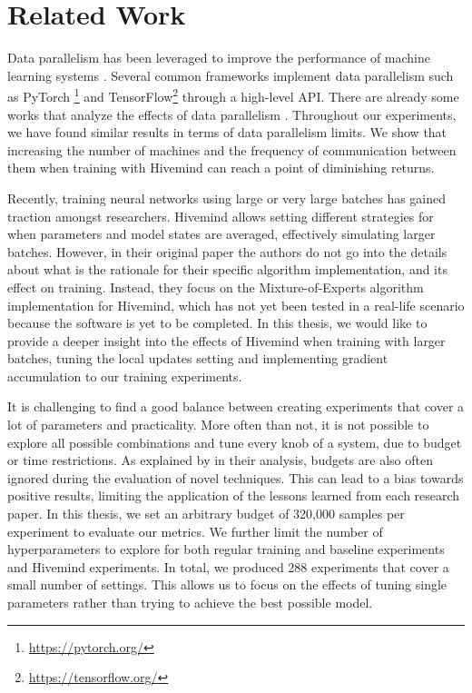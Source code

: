 \chapter{Related Work}\label{chapter:related-work}
Data parallelism has been leveraged to improve the performance of machine learning systems \cite{alexnet2012}.
Several common frameworks implement data parallelism such as PyTorch \footnote{\href{https://pytorch.org/}{https://pytorch.org/}} and TensorFlow\footnote{\href{https://tensorflow.org/}{https://tensorflow.org/}} through a high-level API.
There are already some works that analyze the effects of data parallelism \cite{DBLP:journals/corr/abs-2003-11316,DBLP:journals/corr/abs-1811-03600}.
Throughout our experiments, we have found similar results in terms of data parallelism limits.
We show that increasing the number of machines and the frequency of communication between them when training with Hivemind can reach a point of diminishing returns.

Recently, training neural networks using large or very large batches \cite{DBLP:journals/corr/KeskarMNST16, 10.48550/arxiv.1705.08741} has gained traction amongst researchers.
Hivemind allows setting different strategies for when parameters and model states are averaged, effectively simulating larger batches.
However, in their original paper \cite{ryabinin2020learning} the authors do not go into the details about what is the rationale for their specific algorithm implementation, and its effect on training.
Instead, they focus on the Mixture-of-Experts algorithm implementation for Hivemind, which has not yet been tested in a real-life scenario because the software is yet to be completed.
In this thesis, we would like to provide a deeper insight into the effects of Hivemind when training with larger batches, tuning the local updates setting and implementing gradient accumulation to our training experiments.

It is challenging to find a good balance between creating experiments that cover a lot of parameters and practicality.
More often than not, it is not possible to explore all possible combinations and tune every knob of a system, due to budget or time restrictions.
As explained by  in their analysis, budgets are also often ignored during the evaluation of novel techniques.
This can lead to a bias towards positive results, limiting the application of the lessons learned from each research paper.
In this thesis, we set an arbitrary budget of 320,000 samples per experiment to evaluate our metrics.
We further limit the number of hyperparameters to explore for both regular training and baseline experiments and Hivemind experiments.
In total, we produced 288 experiments that cover a small number of settings.
This allows us to focus on the effects of tuning single parameters rather than trying to achieve the best possible model.

